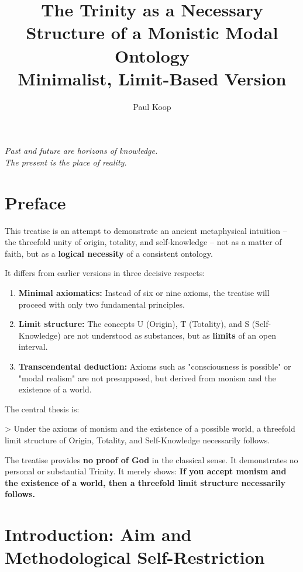 \documentclass[
]{article}
\title{The Trinity as a Necessary Structure of a Monistic Modal Ontology \\ \large Minimalist, Limit-Based Version}
\author{Paul Koop}
\date{}
\begin{document}
\maketitle

\begin{center}
\emph{Past and future are horizons of knowledge. \\ The present is the place of reality.}
\end{center}

\newpage
{
\setcounter{tocdepth}{3}
\tableofcontents
}
\newpage

\section{Preface}\label{preface}

This treatise is an attempt to demonstrate an ancient metaphysical intuition -- the threefold unity of origin, totality, and self-knowledge -- not as a matter of faith, but as a \textbf{logical necessity} of a consistent ontology.

It differs from earlier versions in three decisive respects:

\begin{enumerate}
\item \textbf{Minimal axiomatics:} Instead of six or nine axioms, the treatise will proceed with only two fundamental principles.
\item \textbf{Limit structure:} The concepts U (Origin), T (Totality), and S (Self-Knowledge) are not understood as substances, but as \textbf{limits} of an open interval.
\item \textbf{Transcendental deduction:} Axioms such as "consciousness is possible" or "modal realism" are not presupposed, but derived from monism and the existence of a world.
\end{enumerate}

The central thesis is:

> Under the axioms of monism and the existence of a possible world, a threefold limit structure of Origin, Totality, and Self-Knowledge necessarily follows.

The treatise provides \textbf{no proof of God} in the classical sense. It demonstrates no personal or substantial Trinity. It merely shows: \textbf{If you accept monism and the existence of a world, then a threefold limit structure necessarily follows.}

\section{Introduction: Aim and Methodological Self-Restriction}\label{introduction-aim-and-methodological-self-restriction}
\end{document}
